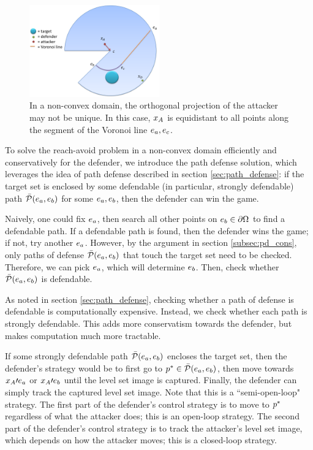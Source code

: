 \begin{figure}[h]
\centering
\includegraphics[width=0.5\textwidth]{"fig/non cvx domain 1"}
\caption{In a non-convex domain, the orthogonal projection of the attacker may not be unique. In this case, $x_A$ is equidistant to all points along the segment of the Voronoi line $e_a,e_c$.}
\label{fig:non_uniq_proj}
\end{figure}

To solve the reach-avoid problem in a non-convex domain efficiently and conservatively for the defender, we introduce the path defense solution, which leverages the idea of path defense described in section \ref{sec:path_defense}: if the target set is enclosed by some defendable (in particular, strongly defendable) path $\bar{\mathcal{P}}(e_a,e_b)$ for some $e_a,e_b$, then the defender can win the game. 

Naively, one could fix $e_a$, then search all other points on $e_b\in\partial\Omega$ to find a defendable path. If a defendable path is found, then the defender wins the game; if not, try another $e_a$. However, by the argument in section \ref{subsec:pd_cons}, only paths of defense $\bar{\mathcal{P}}(e_a,e_b)$ that touch the target set need to be checked. Therefore, we can pick $e_a$, which will determine $e_b$. Then, check whether $\bar{\mathcal{P}}(e_a,e_b)$ is defendable. 

As noted in section \ref{sec:path_defense}, checking whether a path of defense is defendable is computationally expensive. Instead, we check whether each path is strongly defendable. This adds more conservatism towards the defender, but makes computation much more tractable.

If some strongly defendable path $\bar{\mathcal{P}}(e_a,e_b)$ encloses the target set, then the defender's strategy would be to first go to $p^*\in\bar{\mathcal{P}}(e_a,e_b)$, then move towards $x_A\prime{e_a}$ or $x_A\prime{e_b}$ until the level set image is captured. Finally, the defender can simply track the captured level set image. Note that this is a ``semi-open-loop" strategy. The first part of the defender's control strategy is to move to $p^*$ regardless of what the attacker does; this is an open-loop strategy. The second part of the defender's control strategy is to track the attacker's level set image, which depends on how the attacker moves; this is a closed-loop strategy.

